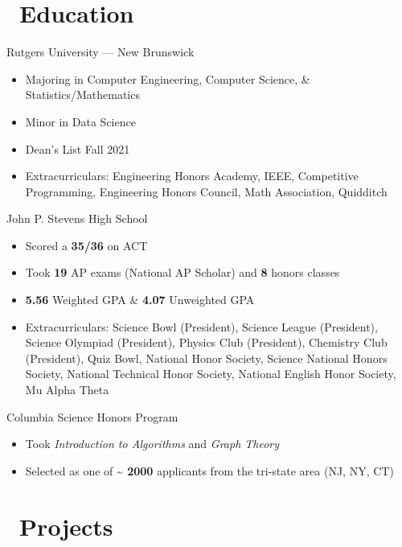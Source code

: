 \documentclass[12]{article}
\begin{document}
\section{\faGraduationCap\ Education}
{Rutgers University --- New Brunswick}
{
  \begin{itemize}
  \item Majoring in Computer Engineering, Computer Science, \& Statistics/Mathematics
  \item Minor in Data Science
  \item Dean's List Fall 2021
  \item Extracurriculars: Engineering Honors Academy, IEEE, Competitive Programming, Engineering Honors Council, Math Association, Quidditch
  \end{itemize}
}
\vspace{-1\baselineskip}
{John P. Stevens High School}
{
  \begin{itemize}
  \item Scored a \textbf{35/36} on ACT
  \item Took \textbf{19} AP exams (National AP Scholar) and \textbf{8} honors classes
  \item \textbf{5.56} Weighted GPA \& \textbf{4.07} Unweighted GPA
  \item Extracurriculars: Science Bowl (President), Science League (President), Science Olympiad (President), Physics Club (President), Chemistry Club (President), Quiz Bowl, National Honor Society, Science National Honors Society, National Technical Honor Society, National English Honor Society, Mu Alpha Theta
  \end{itemize}
}
\vspace{-1\baselineskip}
{Columbia Science Honors Program}
{
  \begin{itemize}
  \item Took \emph{Introduction to Algorithms} and \emph{Graph Theory}
  \item Selected as one of \textbf{\textasciitilde{} 2000} applicants from the tri-state area (NJ, NY, CT)
  \end{itemize}
}
\vspace{-1\baselineskip}


\section{\faSitemap\ Projects}
\end{document}
